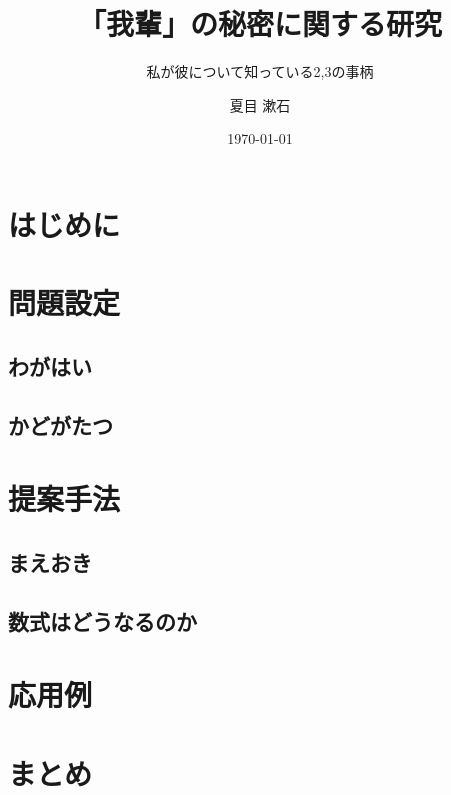 \documentclass[
  leqno, %
  twoside, %
  numbers=noenddot, %
  headsepline, %
  footsepline, %
]{scrbook}
\title{「我輩」の秘密に関する研究}
\subtitle{私が彼について知っている2,3の事柄}
\author{夏目 漱石}
\date{\today}
\begin{document}
\frontmatter
\maketitle

\tableofcontents

\mainmatter
\chapter{はじめに}
\cite{Sonoda2017233,Hino20171838}

\chapter{問題設定}
\section{わがはい}
\section{かどがたつ}
\cite{Kato2017115,Kato2016}

\chapter{提案手法}
\section{まえおき}
\section{数式はどうなるのか}
\blindmathpaper 
\cite{Chiba2017}

\chapter{応用例}
\cite{Takano20162687,Koshijima20161560,Akaho2016}

\chapter{まとめ}

\backmatter
\begin{otherlanguage}{english}
  \printbibliography[title=参考文献]
\end{otherlanguage}
\end{document}
